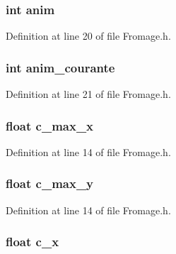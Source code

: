 \hypertarget{struct_fromage_a63c99fe1f6b99dd1d4a139352023459a}{
\subsubsection[{anim}]{\setlength{\rightskip}{0pt plus 5cm}int anim}}\label{struct_fromage_a63c99fe1f6b99dd1d4a139352023459a}


Definition at line 20 of file Fromage.\-h.

\hypertarget{struct_fromage_a7a1d95344655c2e0df3ebbc6a282ae1f}{
\subsubsection[{anim\-\_\-courante}]{\setlength{\rightskip}{0pt plus 5cm}int anim\-\_\-courante}}\label{struct_fromage_a7a1d95344655c2e0df3ebbc6a282ae1f}


Definition at line 21 of file Fromage.\-h.

\hypertarget{struct_fromage_acc9793492dfac2fbf5259cf46e4d6067}{
\subsubsection[{c\-\_\-max\-\_\-x}]{\setlength{\rightskip}{0pt plus 5cm}float c\-\_\-max\-\_\-x}}\label{struct_fromage_acc9793492dfac2fbf5259cf46e4d6067}


Definition at line 14 of file Fromage.\-h.

\hypertarget{struct_fromage_a6fc56c58b8aa8a676f9d3c473b35dbe0}{
\subsubsection[{c\-\_\-max\-\_\-y}]{\setlength{\rightskip}{0pt plus 5cm}float c\-\_\-max\-\_\-y}}\label{struct_fromage_a6fc56c58b8aa8a676f9d3c473b35dbe0}


Definition at line 14 of file Fromage.\-h.

\hypertarget{struct_fromage_a4a1cf9110d6aeb65343be53dbfb5f5e9}{
\subsubsection[{c\-\_\-x}]{\setlength{\rightskip}{0pt plus 5cm}float c\-\_\-x}}\label{struct_fromage_a4a1cf9110d6aeb65343be53dbfb5f5e9}


